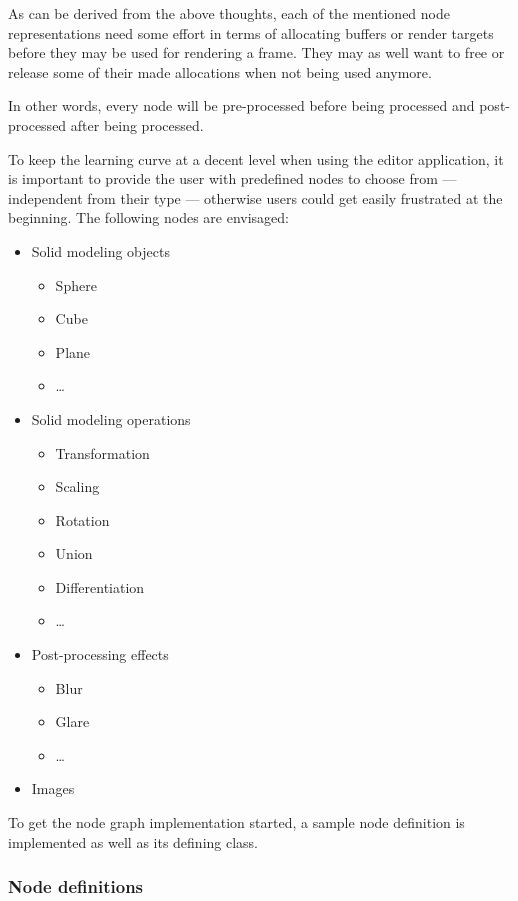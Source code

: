 \documentclass[10pt, openright, notitlepage]{scrreprt}
\begin{document}
As can be derived from the above thoughts, each of the mentioned node
representations need some effort in terms of allocating buffers or render
targets before they may be used for rendering a frame. They may as well want to
free or release some of their made allocations when not being used anymore.

In other words, every node will be pre-processed before being processed and
post-processed after being processed.

To keep the learning curve at a decent level when using the editor application,
it is important to provide the user with predefined nodes to choose from ---
independent from their type --- otherwise users could get easily frustrated at
the beginning. The following nodes are envisaged:

\begin{itemize}
\item Solid modeling objects
\begin{itemize}
\item Sphere
\item Cube
\item Plane
\item \ldots{}
\end{itemize}
\item Solid modeling operations
\begin{itemize}
\item Transformation
\item Scaling
\item Rotation
\item Union
\item Differentiation
\item \ldots{}
\end{itemize}
\item Post-processing effects
\begin{itemize}
\item Blur
\item Glare
\item \ldots{}
\end{itemize}
\item Images
\end{itemize}

To get the node graph implementation started, a sample node definition is
implemented as well as its defining class.

\subsubsection{Node definitions}
\label{sec:org8d22ff7}
\end{document}
